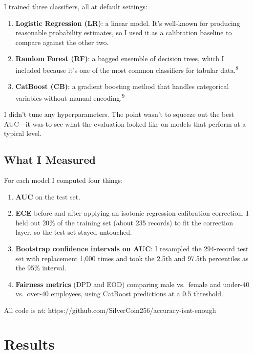 \documentclass[12pt]{article}
\begin{document}
I trained three classifiers, all at default settings:

\begin{enumerate}
  \item \textbf{Logistic Regression (LR)}: a linear model. It's well-known
    for producing reasonable probability estimates, so I used it as a
    calibration baseline to compare against the other two.
  \item \textbf{Random Forest (RF)}: a bagged ensemble of decision trees,
    which I included because it's one of the most common classifiers for
    tabular data.\textsuperscript{8}
  \item \textbf{CatBoost (CB)}: a gradient boosting method that handles
    categorical variables without manual encoding.\textsuperscript{9}
\end{enumerate}

I didn't tune any hyperparameters. The point wasn't to squeeze out the
best AUC---it was to see what the evaluation looked like on models that
perform at a typical level.

\subsection{What I Measured}

For each model I computed four things:

\begin{enumerate}
  \item \textbf{AUC} on the test set.
  \item \textbf{ECE} before and after applying an isotonic regression
    calibration correction. I held out 20\% of the training set (about 235
    records) to fit the correction layer, so the test set stayed untouched.
  \item \textbf{Bootstrap confidence intervals on AUC}: I resampled the
    294-record test set with replacement 1,000 times and took the 2.5th
    and 97.5th percentiles as the 95\% interval.
  \item \textbf{Fairness metrics} (DPD and EOD) comparing male vs.\ female
    and under-40 vs.\ over-40 employees, using CatBoost predictions at a
    0.5 threshold.
\end{enumerate}

All code is at: https://github.com/SilverCoin256/accuracy-isnt-enough

\section{Results}
\end{document}
